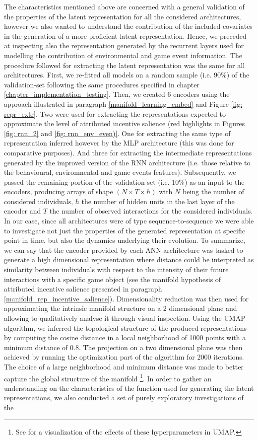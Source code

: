 The characteristics mentioned above are concerned with a general validation of the properties of the latent representation for all the considered architectures, however we also wanted to understand the contribution of the included covariates in the generation of a more proficient latent representation.  Hence, we preceded at inspecting also the representation generated by the recurrent layers used for modelling the contribution of environmental and game event information. The procedure followed for extracting the latent representation was the same for all architectures. First, we re-fitted all models on a random sample (i.e. 90\%) of the validation-set following the same procedures specified in chapter \ref{chapter_implementation_testing}. Then, we created 6 encoders using the approach illustrated in paragraph \ref{manifold_learning_embed} and Figure \ref{fig: repr_extr}. Two were used for extracting the representations expected to approximate the level of attributed incentive salience (red highlights in Figures \ref{fig: rnn_2} and \ref{fig: rnn_env_even)}. One for extracting the same type of representation inferred however by the MLP architecture (this was done for comparative purposes). And  three for extracting the intermediate representations generated by the improved version of the RNN architecture (i.e. those relative to the behavioural, environmental and game events features). Subsequently, we passed the remaining portion of the validation-set (i.e. 10\%) as an input to the encoders, producing arrays of shape $(N \times T \times h)$ with $N$ being the number of considered individuals, $h$ the number of hidden units in the last layer of the encoder and $T$ the number of observed interactions for the considered individuals. In our case, since all architectures were of type sequence-to-sequence we were able to investigate not just the properties of the generated representation at specific point in time, but also the dynamics underlying their evolution. To summarize, we can say that the encoder provided by each ANN architecture was tasked to generate a high dimensional representation where distance could be interpreted as similarity between individuals with respect to the intensity of their future interactions with a specific game object (see the manifold hypothesis of attributed incentive salience presented in paragraph \ref{manifold_rep_incentive_salience}). Dimensionality reduction was then used for approximating the intrinsic manifold structure on a 2 dimensional plane and allowing to qualitatively analyse it through visual inspection. Using the UMAP algorithm, we inferred the topological structure of the produced representations by computing the cosine distance in a local neighborhood of 1000 points with a minimum distance of 0.8. The projection on a two dimensional plane was then achieved by running the optimization part of the algorithm for 2000 iterations. The choice of a large neighborhood and minimum distance was made to better capture the global structure of the manifold \footnote{See \cite{umapwebs} for a visualization of the effects of these hyperparameters in UMAP.}. In order to gather an understanding on the characteristics of the function used for generating the latent representations, we also conducted a set of purely exploratory investigations of the 